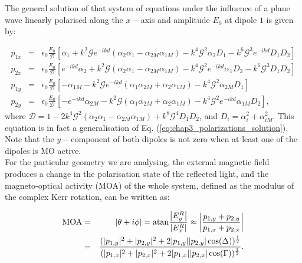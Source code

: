 The general solution of that system of equations under the influence of a plane wave linearly polarised along the $x-$axis and amplitude $E_{0}$ at dipole $1$ is given by:

\begin{eqnarray}
p_{1x}&=&\epsilon_{0}\frac{E_0}{\mathcal{D}}\left[\alpha_1+k^2 \mathcal{G}e^{-ikd}(\alpha_2\alpha_1-\alpha_{2M}\alpha_{1M})-k^4 \mathcal{G}^2\alpha_2D_1-k^6 \mathcal{G}^3e^{-ikd}D_1D_2\right]\nonumber\\
p_{2x}&=&\epsilon_{0}\frac{E_0}{\mathcal{D}}\left[e^{-ikd}\alpha_2+k^2\mathcal{G}(\alpha_2\alpha_1-\alpha_{2M}\alpha_{1M})-k^4\mathcal{G}^2e^{-ikd}\alpha_1D_2-k^6\mathcal{G}^3D_1D_2\right]\nonumber\\
p_{1y}&=&\epsilon_{0}\frac{E_0}{\mathcal{D}}\left[-\alpha_{1M}-k^2\mathcal{G}e^{-ikd}(\alpha_1\alpha_{2M}+\alpha_2\alpha_{1M})-k^4\mathcal{G}^2\alpha_{2M}D_1\right]\nonumber\\
p_{2y}&=&\epsilon_{0}\frac{E_0}{\mathcal{D}}\left[-e^{-ikd}\alpha_{2M}-k^2\mathcal{G}(\alpha_1\alpha_{2M}+\alpha_2\alpha_{1M})-k^4\mathcal{G}^2e^{-ikd}\alpha_{1M}D_2\right],
\label{eq:chap5_dipoles}\end{eqnarray}where $\mathcal{D}=1-2k^4\mathcal{G}^2(\alpha_2\alpha_1-\alpha_{2M}\alpha_{1M})+k^8\mathcal{G}^4D_1D_2$,
and $D_i=\alpha_i^2+\alpha_{iM}^2$. This equation is in fact a generalisation of Eq. (\ref{eq:chap3_polarizations_solution}). Note that the $y-$component of both dipoles is not zero when at least one of the dipoles is MO active.\\
For the particular geometry we are analysing, the external magnetic field produces a change in the polarisation state of the
reflected light, and the magneto-optical activity (MOA) of the whole system, defined as the modulus of the complex Kerr rotation, can be written as:

\begin{eqnarray}
\text{MOA}&=&|\theta+i\phi|=\textnormal{atan}\frac{\left|E_{y}^{R}\right|}{\left|E_{x}^{R}\right|}\approx\left|\frac{p_{1,y}+p_{2,y}}{p_{1,x}+p_{2,x}}\right|\nonumber \\ 
& = & \frac{(|p_{1,y}|^{2}+|p_{2,y}|^{2}+2|p_{1,y}||p_{2,y}|\cos(\Delta))^{\frac{1}{2}}}{(|p_{1,x}|^{2}+|p_{2,x}|^{2}+2|p_{1,x}||p_{2,x}|\cos(\Gamma))^{\frac{1}{2}}}.\label{CRot}
\end{eqnarray}

